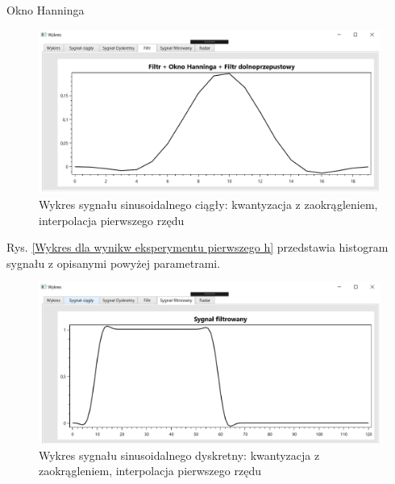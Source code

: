 \documentclass[12pt]{article}
\begin{document}
\newpage
Okno Hanninga
\begin{figure}[h!]
 \centering
 \includegraphics[width=12.3cm]{prostFDOHn.PNG}
 \vspace{-0.3cm}
 \caption{Wykres sygnału sinusoidalnego ciągły: kwantyzacja z zaokrągleniem, interpolacja pierwszego rzędu}
 \label{Wykres dla wyników eksperymentu drugiego}
\end{figure}
\newpage
Rys. \ref{Wykres dla wynikw eksperymentu pierwszego h} przedstawia histogram sygnału z opisanymi powyżej parametrami. 
\begin{figure}[h!]
 \centering
 \includegraphics[width=12.3cm]{prostSFDHn.PNG}
 \vspace{-0.3cm}
 \caption{Wykres sygnału sinusoidalnego dyskretny: kwantyzacja z zaokrągleniem, interpolacja pierwszego rzędu}
 \label{Histogram dla wyników eksperymentu drugiego}
\end{figure}
\end{document}
